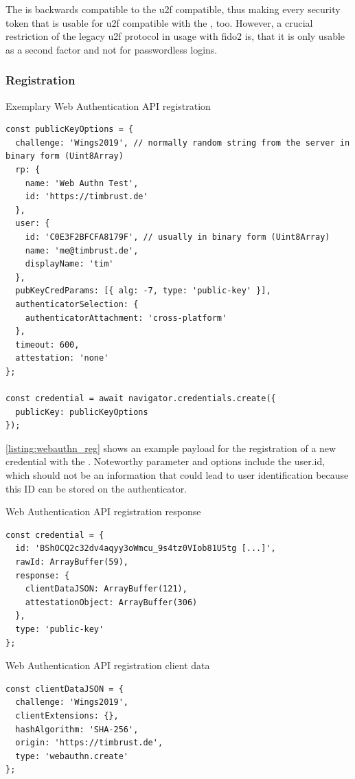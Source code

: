 The \wa{} is backwards compatible to the \gls{u2f} compatible, thus making every security token that is usable for \gls{u2f} compatible with the \wa, too. However, a crucial restriction of the legacy \gls{u2f} protocol in usage with \gls{fido}2 is, that it is only usable as a second factor and not for passwordless logins.

\subsubsection{Registration}

\begin{example}{Exemplary Web Authentication API registration}
\begin{verbatim}
const publicKeyOptions = {
  challenge: 'Wings2019', // normally random string from the server in binary form (Uint8Array)
  rp: {
    name: 'Web Authn Test',
    id: 'https://timbrust.de'
  },
  user: {
    id: 'C0E3F2BFCFA8179F', // usually in binary form (Uint8Array)
    name: 'me@timbrust.de',
    displayName: 'tim'
  },
  pubKeyCredParams: [{ alg: -7, type: 'public-key' }],
  authenticatorSelection: {
    authenticatorAttachment: 'cross-platform'
  },
  timeout: 600,
  attestation: 'none'
};

const credential = await navigator.credentials.create({
  publicKey: publicKeyOptions
});
\end{verbatim}
\label{listing:webauthn_reg}
\end{example}

\autoref{listing:webauthn_reg} shows an example payload for the registration of a new credential with the \wa. Noteworthy parameter and options include the user.id, which should not be an information that could lead to user identification because this ID can be stored on the authenticator.

\begin{example}{Web Authentication API registration response}
\begin{verbatim}
const credential = {
  id: 'BShOCQ2c32dv4aqyy3oWmcu_9s4tz0VIob81U5tg [...]',
  rawId: ArrayBuffer(59),
  response: {
    clientDataJSON: ArrayBuffer(121),
    attestationObject: ArrayBuffer(306)
  },
  type: 'public-key'
};
\end{verbatim}
\label{listing:webauthn_reg_resp}
\end{example}

\begin{example}{Web Authentication API registration client data}
\begin{verbatim}
const clientDataJSON = {
  challenge: 'Wings2019',
  clientExtensions: {},
  hashAlgorithm: 'SHA-256',
  origin: 'https://timbrust.de',
  type: 'webauthn.create'
};
\end{verbatim}
\label{listing:webauthn_reg_resp_client_data}
\end{example}

